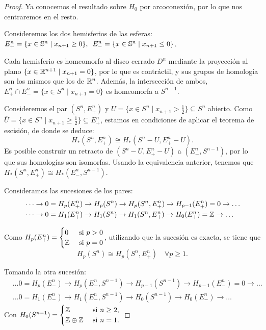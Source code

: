 \begin{proof}
  Ya conocemos el resultado sobre $H_0$ por arcoconexión, por lo que nos centraremos en el resto.

  Consideremos los dos hemisferios de las esferas: \\
  $E_+^n = \{x \in \S^n \mid x_{n+1} \geq 0\}, \hspace{0.5em} E_-^n = \{x \in \S^n \mid x_{n+1} \leq 0\}$.

  Cada hemisferio es homeomorfo al disco cerrado $D^n$ mediante la proyección al plano $\{x \in \R^{n+1} \mid x_{n+1} = 0\}$,
  por lo que es contráctil, y sus grupos de homología son los mismos que los de $\R^n$. Además, la intersección de
  ambos, $E_+^n \cap E_-^n = \{x \in S^n \mid x_{n+1} = 0\}$ es homeomorfa a $S^{n-1}$.

  Consideremos el par $(S^n, E_+^n)$ y $U = \{x \in S^n \mid x_{n+1} > \frac{1}{2}\} \subseteq S^n$ abierto. Como
  $\overline{U} = \{x \in S^n \mid x_{n+1} \geq \frac{1}{2}\} \subseteq E_+^n$, estamos en condiciones de aplicar
  el teorema de escisión, de donde se deduce:
  \[ H_*(S^n, E_+^n) \cong H_*(S^n - U, E_+^n - U). \]
  Es posible construir un retracto de $(S^n - U, E_+^n - U)$ a $(E_-^n, S^{n-1})$, por lo que sus
  homologías son isomorfas. Usando la equivalencia anterior, tenemos que $H_*(S^n, E_+^n) \cong H_*(E_-^n, S^{n-1})$.

  Consideramos las sucesiones de los pares:
  \begin{align*}
    &\dots \to 0 = H_p(E_+^n) \to H_p(S^n) \to H_p(S^n, E_+^n) \to H_{p-1}(E_+^n) = 0 \to \dots \\
    &\dots \to 0 = H_1(E_+^n) \to H_1(S^n) \to H_1(S^n, E_+^n) \to H_0(E_+^n) = \Z \to \dots
  \end{align*}

  Como $H_p(E_+^n) = \begin{cases} 0 &\text{ si } p > 0 \\ \Z &\text{ si } p = 0 \end{cases}$,
  utilizando que la sucesión es exacta, se tiene que
  \[H_p(S^n) \cong H_p(S^n, E_+^n) \quad \forall p \geq 1.\]

  Tomando la otra sucesión:
  \begin{align*}
    &\dots 0 = H_p(E_-^n) \to H_p(E_-^n, S^{n-1}) \to H_{p-1}(S^{n-1}) \to H_{p-1}(E_-^n) = 0 \to \dots \\
    &\dots 0 = H_1(E_-^n) \to H_1(E_-^n, S^{n-1}) \to H_0(S^{n-1}) \to H_0(E_-^n) \to \dots
  \end{align*}
  Con $H_0(S^{n-1}) = \begin{cases} \Z &\text{ si } n \geq 2, \\ \Z \oplus \Z &\text{ si } n = 1. \end{cases}$


\end{proof}
